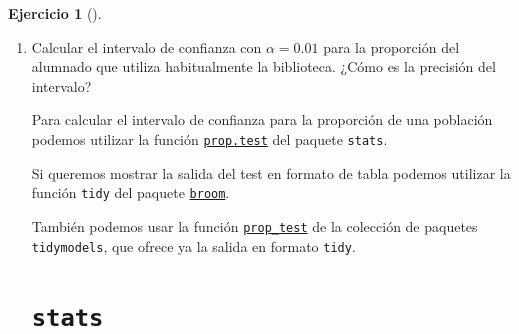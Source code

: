 \documentclass[
  a4paper,
]{scrreport}
\theoremstyle{definition}
\newtheorem{exercise}{Ejercicio}[chapter]
\theoremstyle{remark}
\begin{document}
\begin{exercise}[]
\begin{enumerate}
\begin{tcolorbox}
  \end{tcolorbox}
\item
  Calcular el intervalo de confianza con \(\alpha=0.01\) para la
  proporción del alumnado que utiliza habitualmente la biblioteca. ¿Cómo
  es la precisión del intervalo?

  \begin{tcolorbox}[enhanced jigsaw, coltitle=black, left=2mm, colback=white, leftrule=.75mm, toptitle=1mm, breakable, bottomrule=.15mm, titlerule=0mm, bottomtitle=1mm, title=\textcolor{quarto-callout-note-color}{\faInfo}\hspace{0.5em}{Ayuda}, arc=.35mm, toprule=.15mm, rightrule=.15mm, colframe=quarto-callout-note-color-frame, opacityback=0, colbacktitle=quarto-callout-note-color!10!white, opacitybacktitle=0.6]

  Para calcular el intervalo de confianza para la proporción de una
  población podemos utilizar la función
  \href{https://www.rdocumentation.org/packages/stats/versions/3.6.2/topics/prop.test}{\texttt{prop.test}}
  del paquete \texttt{stats}.

  Si queremos mostrar la salida del test en formato de tabla podemos
  utilizar la función \texttt{tidy} del paquete
  \href{https://broom.tidymodels.org/index.html}{\texttt{broom}}.

  También podemos usar la función
  \href{https://infer.tidymodels.org/reference/prop_test.html}{\texttt{prop\_test}}
  de la colección de paquetes \texttt{tidymodels}, que ofrece ya la
  salida en formato \texttt{tidy}.

  \end{tcolorbox}

  \begin{tcolorbox}[enhanced jigsaw, coltitle=black, left=2mm, colback=white, leftrule=.75mm, toptitle=1mm, breakable, bottomrule=.15mm, titlerule=0mm, bottomtitle=1mm, title=\textcolor{quarto-callout-tip-color}{\faLightbulb}\hspace{0.5em}{Solución}, arc=.35mm, toprule=.15mm, rightrule=.15mm, colframe=quarto-callout-tip-color-frame, opacityback=0, colbacktitle=quarto-callout-tip-color!10!white, opacitybacktitle=0.6]

  \section{\texorpdfstring{\texttt{stats}}{stats}}


\end{tcolorbox}
\end{enumerate}
\end{exercise}
\end{document}
